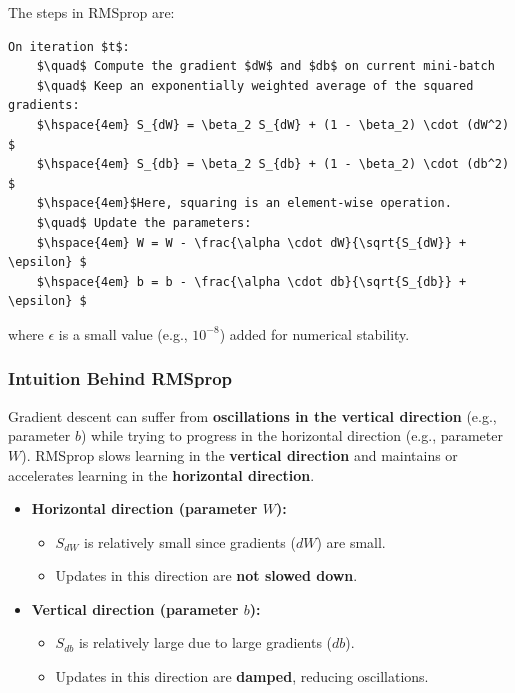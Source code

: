 \documentclass[letterpaper,12pt,notitlepage,twoside]{report}
\begin{document}
The steps in RMSprop are:
\begin{lstlisting}
On iteration $t$: 
	$\quad$ Compute the gradient $dW$ and $db$ on current mini-batch
	$\quad$ Keep an exponentially weighted average of the squared gradients:
	$\hspace{4em} S_{dW} = \beta_2 S_{dW} + (1 - \beta_2) \cdot (dW^2) $
	$\hspace{4em} S_{db} = \beta_2 S_{db} + (1 - \beta_2) \cdot (db^2) $
	$\hspace{4em}$Here, squaring is an element-wise operation.
	$\quad$ Update the parameters:
	$\hspace{4em} W = W - \frac{\alpha \cdot dW}{\sqrt{S_{dW}} + \epsilon} $
	$\hspace{4em} b = b - \frac{\alpha \cdot db}{\sqrt{S_{db}} + \epsilon} $	
\end{lstlisting}
where \( \epsilon \) is a small value (e.g., \( 10^{-8} \)) added for numerical stability.

\subsubsection*{Intuition Behind RMSprop}
Gradient descent can suffer from \textbf{oscillations in the vertical direction} (e.g., parameter \( b \)) while trying to progress in the horizontal direction (e.g., parameter \( W \)). RMSprop slows learning in the \textbf{vertical direction} and maintains or accelerates learning in the \textbf{horizontal direction}.

\begin{itemize}[nosep]
    \item \textbf{Horizontal direction (parameter \( W \)):}
    \begin{itemize}
        \item \( S_{dW} \) is relatively small since gradients (\( dW \)) are small.
        \item Updates in this direction are \textbf{not slowed down}.
    \end{itemize}
    \item \textbf{Vertical direction (parameter \( b \)):}
    \begin{itemize}
        \item \( S_{db} \) is relatively large due to large gradients (\( db \)).
        \item Updates in this direction are \textbf{damped}, reducing oscillations.
    \end{itemize}
\end{itemize}
\end{document}
